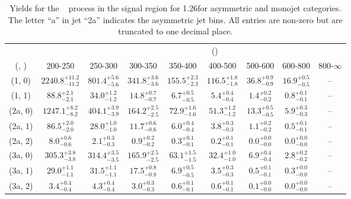 \begin{table}[h!]
\tiny
\centering
\caption{Yields for the \zInv~ process in the signal region for 1.26\ifb for asymmetric and monojet categories. The letter ``a'' in jet \eg ``2a''  indicates the asymmetric jet bins. All entries are non-zero but are truncated to one decimal place.\label{tab:yieldssep_sig_zinv_asym}}
\begin{tabular}
{ccccccccc}
	\hline\hline
&	& \multicolumn{8}{c}{\scalht (\gev)} \\ 
	 (\njet,  \nb) & 200-250 & 250-300 & 300-350 & 350-400 & 400-500 & 500-600 & 600-800 & 800-$\infty$ \\ [0.8ex] 
\hline
	(1, 0) & $2240.8^{+ 11.2 }_{- 11.2 }$ & $801.4^{+ 5.6 }_{- 5.6 }$ & $341.8^{+ 3.6 }_{- 3.6 }$ & $155.5^{+ 2.3 }_{- 2.3 }$ & $116.5^{+ 1.8 }_{- 1.8 }$ & $36.8^{+ 0.9 }_{- 0.9 }$ & $16.9^{+ 0.5 }_{- 0.5 }$ & -- \\[0.5ex] 
	(1, 1) & $88.8^{+ 2.1 }_{- 2.1 }$ & $34.0^{+ 1.2 }_{- 1.2 }$ & $14.8^{+ 0.7 }_{- 0.7 }$ & $6.7^{+ 0.5 }_{- 0.5 }$ & $5.4^{+ 0.4 }_{- 0.4 }$ & $1.4^{+ 0.2 }_{- 0.2 }$ & $0.8^{+ 0.1 }_{- 0.1 }$ & -- \\[0.5ex] 
	(2a, 0) & $1247.1^{+ 8.2 }_{- 8.2 }$ & $404.1^{+ 3.9 }_{- 3.9 }$ & $164.2^{+ 2.5 }_{- 2.5 }$ & $72.9^{+ 1.6 }_{- 1.6 }$ & $51.3^{+ 1.2 }_{- 1.2 }$ & $13.3^{+ 0.5 }_{- 0.5 }$ & $5.9^{+ 0.3 }_{- 0.3 }$ & -- \\[0.5ex] 
	(2a, 1) & $86.5^{+ 2.0 }_{- 2.0 }$ & $28.0^{+ 1.0 }_{- 1.0 }$ & $11.7^{+ 0.6 }_{- 0.6 }$ & $6.0^{+ 0.4 }_{- 0.4 }$ & $3.8^{+ 0.3 }_{- 0.3 }$ & $1.1^{+ 0.2 }_{- 0.2 }$ & $0.5^{+ 0.1 }_{- 0.1 }$ & -- \\[0.5ex] 
	(2a, 2) & $8.0^{+ 0.6 }_{- 0.6 }$ & $2.1^{+ 0.3 }_{- 0.3 }$ & $0.9^{+ 0.2 }_{- 0.2 }$ & $0.3^{+ 0.1 }_{- 0.1 }$ & $0.2^{+ 0.1 }_{- 0.1 }$ & $0.0^{+ 0.0 }_{- 0.0 }$ & $0.0^{+ 0.0 }_{- 0.0 }$ & -- \\[0.5ex] 
	(3a, 0) & $305.3^{+ 3.8 }_{- 3.8 }$ & $314.4^{+ 3.5 }_{- 3.5 }$ & $165.9^{+ 2.5 }_{- 2.5 }$ & $63.1^{+ 1.5 }_{- 1.5 }$ & $32.4^{+ 1.0 }_{- 1.0 }$ & $6.9^{+ 0.4 }_{- 0.4 }$ & $2.8^{+ 0.2 }_{- 0.2 }$ & -- \\[0.5ex] 
	(3a, 1) & $29.0^{+ 1.1 }_{- 1.1 }$ & $31.5^{+ 1.1 }_{- 1.1 }$ & $17.5^{+ 0.8 }_{- 0.8 }$ & $6.9^{+ 0.5 }_{- 0.5 }$ & $3.5^{+ 0.3 }_{- 0.3 }$ & $0.5^{+ 0.1 }_{- 0.1 }$ & $0.3^{+ 0.0 }_{- 0.0 }$ & -- \\[0.5ex] 
	(3a, 2) & $3.4^{+ 0.4 }_{- 0.4 }$ & $4.3^{+ 0.4 }_{- 0.4 }$ & $3.0^{+ 0.3 }_{- 0.3 }$ & $0.6^{+ 0.1 }_{- 0.1 }$ & $0.6^{+ 0.1 }_{- 0.1 }$ & $0.1^{+ 0.0 }_{- 0.0 }$ & $0.0^{+ 0.0 }_{- 0.0 }$ & -- \\[0.5ex] 

\end{tabular}
\end{table}
